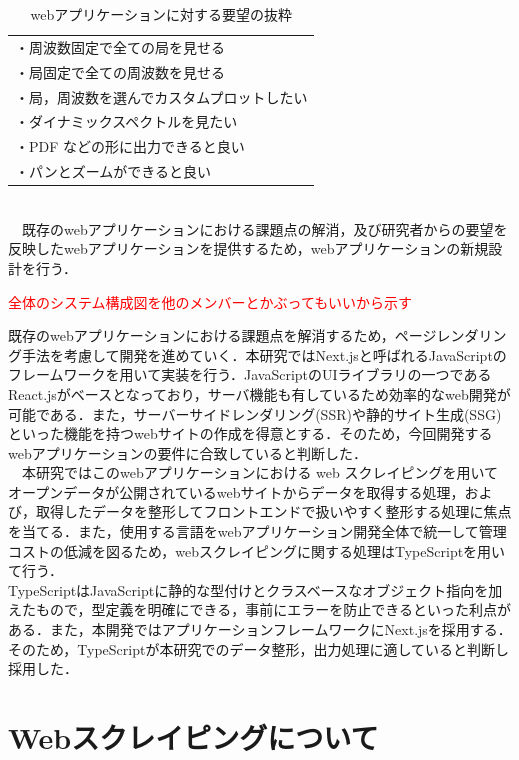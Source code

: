 \begin{table}[h]
  \centering
  \caption{webアプリケーションに対する要望の抜粋}
  \begin{tabular}{l}
  \toprule
    ・周波数固定で全ての局を見せる\\
    ・局固定で全ての周波数を見せる\\
    ・局，周波数を選んでカスタムプロットしたい\\
    ・ダイナミックスペクトルを見たい\\
    ・PDF などの形に出力できると良い\\
    ・パンとズームができると良い
  \end{tabular}
\end{table}\\
　既存のwebアプリケーションにおける課題点の解消，及び研究者からの要望を反映したwebアプリケーションを提供するため，webアプリケーションの新規設計を行う．

\textcolor{red}{全体のシステム構成図を他のメンバーとかぶってもいいから示す}

既存のwebアプリケーションにおける課題点を解消するため，ページレンダリング手法を考慮して開発を進めていく．本研究ではNext.jsと呼ばれるJavaScriptのフレームワークを用いて実装を行う．JavaScriptのUIライブラリの一つであるReact.jsがベースとなっており，サーバ機能も有しているため効率的なweb開発が可能である．また，サーバーサイドレンダリング(SSR)や静的サイト生成(SSG)といった機能を持つwebサイトの作成を得意とする．そのため，今回開発するwebアプリケーションの要件に合致していると判断した．\cite{next}\\
　本研究ではこのwebアプリケーションにおける web スクレイピングを用いてオープンデータが公開されているwebサイトからデータを取得する処理，および，取得したデータを整形してフロントエンドで扱いやすく整形する処理に焦点を当てる．また，使用する言語をwebアプリケーション開発全体で統一して管理コストの低減を図るため，webスクレイピングに関する処理はTypeScriptを用いて行う．\\
 TypeScriptはJavaScriptに静的な型付けとクラスベースなオブジェクト指向を加えたもので，型定義を明確にできる，事前にエラーを防止できるといった利点がある．また，本開発ではアプリケーションフレームワークにNext.jsを採用する．そのため，TypeScriptが本研究でのデータ整形，出力処理に適していると判断し採用した．

\section{Webスクレイピングについて}

